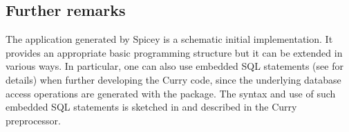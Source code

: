 \subsection{Further remarks}

The application generated by Spicey is a schematic initial implementation.
It provides an appropriate basic programming structure but
it can be extended in various ways.
In particular, one can also use embedded SQL statements
(see \cite{HanusKrone17EPTCS} for details)
when further developing the Curry code, since the underlying database
access operations are generated with the  package.
The syntax and use of such embedded SQL statements
is sketched in \cite{HanusKrone17EPTCS} and
described in the Curry preprocessor.
